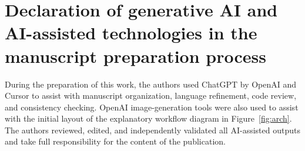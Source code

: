 \documentclass[a4paper,fleqn]{cas-dc}
\begin{document}
\section*{Declaration of generative AI and AI-assisted technologies in the
manuscript preparation process}
During the preparation of this work, the authors used ChatGPT by OpenAI and
Cursor to assist with manuscript organization, language refinement, code review,
and consistency checking. OpenAI image-generation tools were also used to assist
with the initial layout of the explanatory workflow diagram in Figure~\ref{fig:arch}.
The authors reviewed, edited, and independently validated all AI-assisted
outputs and take full responsibility for the content of the publication.

\FloatBarrier


\end{document}
